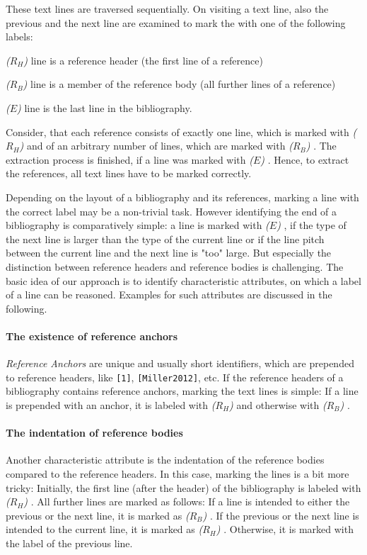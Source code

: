 These text lines are traversed sequentially. On visiting a text line, also the previous and the next line are examined to mark the with one of the following labels:

\newcommand{\refhead}{\textit{($R_H$)} }
\newcommand{\refbody}{\textit{($R_B$)} }
\newcommand{\bibend}{\textit{($E$)} }

\par\medskip\noindent
\refhead line is a reference header (the first line of a reference)
\par\smallskip\noindent
\refbody line is a member of the reference body (all further lines of a reference)
\par\smallskip\noindent
\bibend line is the last line in the bibliography.
\medskip

\noindent Consider, that each reference consists of exactly one line, which is marked with \refhead and of an arbitrary number of lines, which are marked with \refbody. The extraction process is finished, if a line was marked with \bibend. Hence, to extract the references, all text lines have to be marked correctly.

Depending on the layout of a bibliography and its references, marking a line with the correct label may be a non-trivial task. However identifying the end of a bibliography is comparatively simple: a line is marked with \bibend, if the type of the next line is larger than the type of the current line or if the line pitch between the current line and the next line is "too" large. But especially the distinction between reference headers and reference bodies is challenging. The basic idea of our approach is to identify characteristic attributes, on which a label of a line can be reasoned. Examples for such attributes are discussed in the following.

\paragraph{The existence of reference anchors}
\textit{Reference Anchors} are unique and usually short identifiers, which are  
prepended to reference headers, like \texttt{[1]}, \texttt{[Miller2012]}, etc.
If the reference headers of a bibliography contains reference anchors, marking the text lines is simple: If a line is prepended with an anchor, it is labeled with \refhead and otherwise with \refbody. 

\paragraph{The indentation of reference bodies}
Another characteristic attribute is the indentation of the reference bodies compared to the reference headers. In this case, marking the lines is a bit more tricky: Initially, the first line (after the header) of the bibliography is labeled with \refhead. All further lines are marked as follows: If a line is intended to either the previous or the next line, it is marked as \refbody.
If the previous or the next line is intended to the current line, it is marked as \refhead. Otherwise, it is marked with the label of the previous line.

